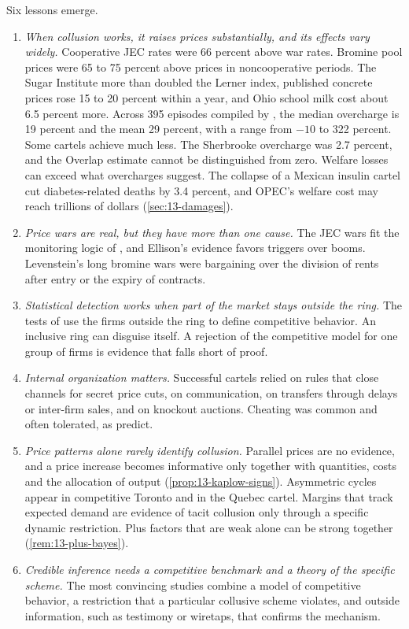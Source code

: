 Six lessons emerge.
\begin{enumerate}[label=(\arabic*)]
\item \emph{When collusion works, it raises prices substantially, and its effects vary widely.} Cooperative JEC
rates were 66 percent above war rates. Bromine pool prices were 65 to 75 percent above prices in noncooperative
periods. The Sugar Institute more than doubled the Lerner index, published concrete prices rose 15 to 20 percent
within a year, and Ohio school milk cost about 6.5 percent more. Across 395 episodes compiled by
\citet{ConnorBolotova2006}, the median overcharge is 19 percent and the mean 29 percent, with a range from $-10$ to
322 percent. Some cartels achieve much less. The Sherbrooke overcharge was 2.7 percent, and the Overlap estimate
cannot be distinguished from zero. Welfare losses can exceed what overcharges suggest. The collapse of a Mexican
insulin cartel cut diabetes-related deaths by 3.4 percent, and OPEC's welfare cost may reach trillions of dollars
(\cref{sec:13-damages}).
\item \emph{Price wars are real, but they have more than one cause.} The JEC wars fit the monitoring logic of
\citet{GreenPorter1984}, and Ellison's evidence favors triggers over booms. Levenstein's long bromine wars were
bargaining over the division of rents after entry or the expiry of contracts.
\item \emph{Statistical detection works when part of the market stays outside the ring.} The tests of \citet{PorterZona1993,PorterZona1999} use the firms outside
the ring to define competitive behavior. An inclusive ring can disguise itself. A
rejection of the competitive model for one group of firms is evidence that falls short of proof.
\item \emph{Internal organization matters.} Successful cartels relied on rules that close channels for secret price
cuts, on communication, on transfers through delays or inter-firm sales, and on knockout auctions. Cheating was
common and often tolerated, as \citet{BernheimMadsen2017} predict.
\item \emph{Price patterns alone rarely identify collusion.} Parallel prices are no evidence, and a price increase
becomes informative only together with quantities, costs and the allocation of output
(\cref{prop:13-kaplow-signs}). Asymmetric cycles appear in competitive Toronto and in the Quebec cartel. Margins
that track expected demand are evidence of tacit collusion only through a specific dynamic restriction. Plus
factors that are weak alone can be strong together (\cref{rem:13-plus-bayes}).
\item \emph{Credible inference needs a competitive benchmark and a theory of the specific scheme.} The most
convincing studies combine a model of competitive behavior, a restriction that a particular collusive scheme
violates, and outside information, such as testimony or wiretaps, that confirms the mechanism.
\end{enumerate}

